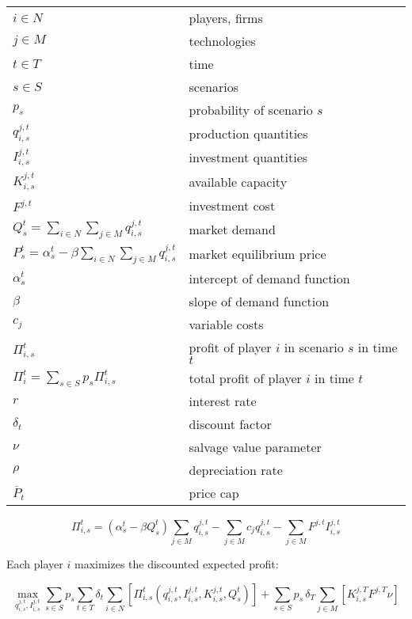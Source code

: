 \begin{longtable}[l]{l l}
$i \in N$ & players, firms \\
$j \in M$ & technologies \\
$t \in T$ & time \\
$s \in S$ & scenarios \\
$p_s$ & probability of scenario $s$\\
$ q_{i,s}^{j,t}$ & production quantities \\
$I_{i,s}^{j,t}$ & investment quantities \\
$K_{i,s}^{j,t}$ & available capacity\\
$F^{j,t}$ & investment cost\\
$Q_s^t = \sum_{i\in N}\sum_{j\in M} q_{i,s}^{j,t}$ & market demand \\
$P_s^t = \alpha_s^t-\beta\sum_{i\in N}\sum_{j\in M}q_{i,s}^{j,t}$ & market equilibrium price \\
$\alpha_s^t$ & intercept of demand function \\
$\beta$ & slope of demand function \\
$c_j$ & variable costs \\
$\Pi_{i,s}^t$ & profit of player $i$ in scenario $s$ in time $t$\\
$\Pi_i^t = \sum_{s\in S}p_s\Pi_{i,s}^t$ & total profit of player $i$ in time $t$\\
$r$ & interest rate \\
$\delta_t$ & discount factor \\
$\nu$ & salvage value parameter\\
$\rho$ & depreciation rate\\
$\overline{P}_t$ & price cap\\ 

\end{longtable}

\begin{equation}
\Pi_{i,s}^t = \left(\alpha_s^t-\beta Q_s^t \right)\sum_{j\in M}q_{i,s}^{j,t}-\sum_{j\in M}c_jq_{i,s}^{j,t}-\sum_{j\in M}F^{j,t}I_{i,s}^{j,t}
\end{equation}

Each player $i$ maximizes the discounted expected profit:

\begin{equation}
  \label{eq:objfct}
  \max_{q_{i,s}^{j,t}, I_{i,s}^{j,t}} \sum_{s\in S}p_s \sum_{t\in T}\delta_t \sum_{i\in N}\left[\Pi_{i,s}^t\left(q_{i,s}^{j,t}, I_{i,s}^{j,t}, K_{i,s}^{j,t}, Q_s^t\right) \right ]+ \sum_{s\in S}p_s\,\delta_T \sum_{j\in M}\left[K_{i,s}^{j,T}F^{j,T}\nu\right]
\end{equation}

